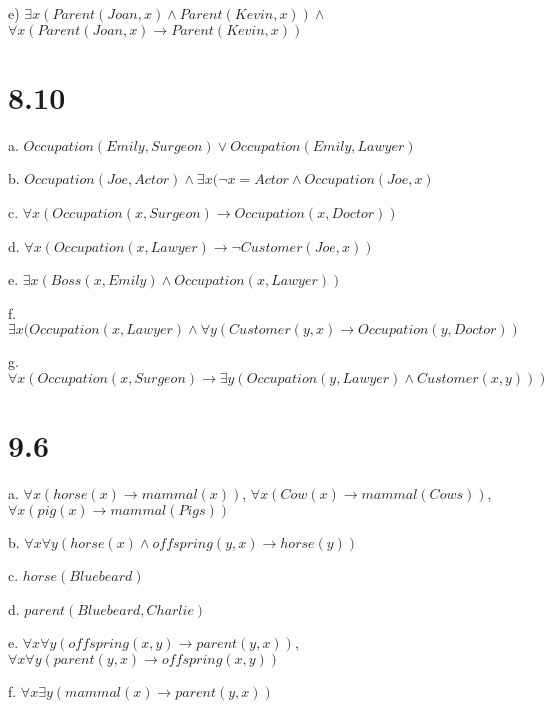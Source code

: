 \documentclass[spanish]{article}
\begin{document}
e) $\exists x (Parent(Joan,x) \wedge Parent(Kevin,x))\wedge$ $\forall x (Parent(Joan,x) \rightarrow Parent(Kevin,x))$

\section*{8.10}

a. $Occupation(Emily,Surgeon) \vee Occupation(Emily, Lawyer)$

b. $Occupation(Joe,Actor)\wedge \exists x (\neg x = Actor \wedge Occupation(Joe,x)$

c. $\forall x (Occupation(x,Surgeon) \rightarrow Occupation(x,Doctor))$

d. $\forall x (Occupation(x,Lawyer) \rightarrow \neg Customer(Joe,x))$

e. $\exists x (Boss(x,Emily) \wedge Occupation(x,Lawyer))$

f. $\exists x (Occupation(x,Lawyer)\wedge \forall y (Customer(y,x)\rightarrow Occupation(y,Doctor))$

g. $\forall x (Occupation(x,Surgeon) \rightarrow \exists y (Occupation(y, Lawyer)\wedge Customer(x,y)))$

\section*{9.6}

a. $\forall x  (horse(x)\rightarrow mammal(x))$, $\forall x (Cow(x) \rightarrow mammal(Cows))$, $\forall x (pig(x)\rightarrow mammal(Pigs))$

b. $\forall x \forall y (horse(x)\wedge offspring(y,x) \rightarrow horse(y))$

c. $horse(Bluebeard)$

d. $parent(Bluebeard,Charlie)$

e. $\forall x \forall y(offspring(x,y) \rightarrow parent(y,x))$, $\forall x \forall y (parent(y,x) \rightarrow offspring(x,y))$

f. $\forall x \exists y (mammal(x) \rightarrow parent(y,x))$
\end{document}

